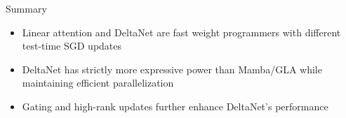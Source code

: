 \begin{frame}{Summary}
    \begin{itemize}
        \item Linear attention and DeltaNet are fast weight programmers with different test-time SGD updates
        \item DeltaNet has strictly more expressive power than Mamba/GLA while maintaining efficient parallelization
        \item Gating and high-rank updates further enhance DeltaNet's performance
    \end{itemize}
\end{frame}



% 

% 

%     

    


